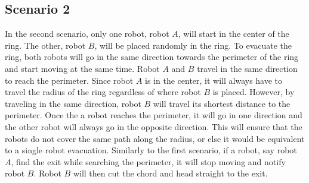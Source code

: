 \documentclass[12pt,letterpaper]{article}
\begin{document}
        \subsection{Scenario 2}
        In the second scenario, only one robot, robot $A$, will start in the center of the ring. The other, robot $B$, will be placed randomly in the ring. To evacuate the ring, both robots will go in the same direction towards the perimeter of the ring and start moving at the same time. Robot $A$ and $B$ travel in the same direction to reach the perimeter. Since robot $A$ is in the center, it will always have to travel the radius of the ring regardless of where robot $B$ is placed. However, by traveling in the same direction, robot $B$ will travel its shortest distance to the perimeter. Once the a robot reaches the perimeter, it will go in one direction and the other robot will always go in the opposite direction. This will ensure that the robots do not cover the same path along the radius, or else it would be equivalent to a single robot evacuation. Similarly to the first scenario, if a robot, say robot $A$, find the exit while searching the perimeter, it will stop moving and notify robot $B$. Robot $B$ will then cut the chord and head straight to the exit.
        
\end{document}
